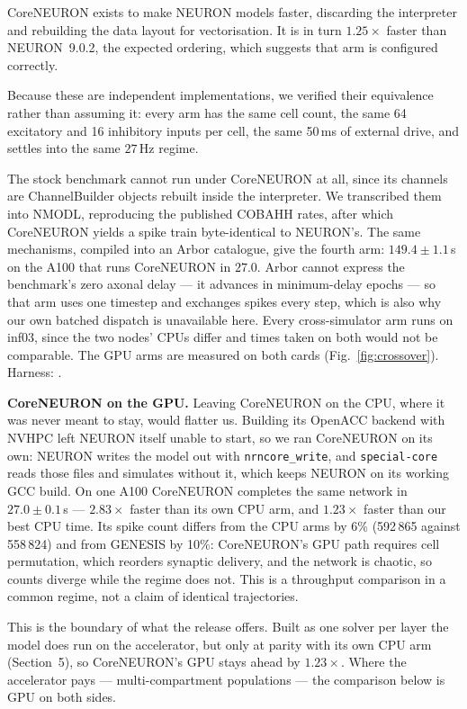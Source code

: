 \documentclass[preprint,12pt, a4paper]{elsarticle}
\begin{document}
\begin{enumerate}
CoreNEURON exists to make NEURON models faster, discarding the interpreter and rebuilding the data layout for vectorisation. It is in turn $1.25\times$ faster than NEURON~9.0.2, the expected ordering, which suggests that arm is configured correctly.

Because these are independent implementations, we verified their equivalence rather than assuming it: every arm has the same cell count, the same 64 excitatory and 16 inhibitory inputs per cell, the same 50\,ms of external drive, and settles into the same $27$\,Hz regime. 

The stock benchmark cannot run under CoreNEURON at all, since its channels are ChannelBuilder objects rebuilt inside the interpreter. We transcribed them into NMODL, reproducing the published COBAHH rates, after which CoreNEURON yields a spike train byte-identical to NEURON's. The same mechanisms, compiled into an Arbor catalogue, give the fourth arm: $149.4\pm1.1$\,s on the A100 that runs CoreNEURON in $27.0$. Arbor cannot express the benchmark's zero axonal delay --- it advances in minimum-delay epochs --- so that arm uses one timestep and exchanges spikes every step, which is also why our own batched dispatch is unavailable here. Every cross-simulator arm runs on inf03, since the two nodes' CPUs differ and times taken on both would not be comparable. The GPU arms are measured on both cards (Fig.~\ref{fig:crossover}). Harness: .

\textbf{CoreNEURON on the GPU.} Leaving CoreNEURON on the CPU, where it was never meant to stay, would flatter us. Building its OpenACC backend with NVHPC left NEURON itself unable to start, so we ran CoreNEURON on its own: NEURON writes the model out with \texttt{nrncore\_write}, and \texttt{special-core} reads those files and simulates without it, which keeps NEURON on its working GCC build. On one A100 CoreNEURON completes the same network in $27.0\pm0.1$\,s --- $2.83\times$ faster than its own CPU arm, and $1.23\times$ faster than our best CPU time. Its spike count differs from the CPU arms by 6\% (592\,865 against 558\,824) and from GENESIS by 10\%: CoreNEURON's GPU path requires cell permutation, which reorders synaptic delivery, and the network is chaotic, so counts diverge while the regime does not. This is a throughput comparison in a common regime, not a claim of identical trajectories.

This is the boundary of what the release offers. Built as one solver per layer the model does run on the accelerator, but only at parity with its own CPU arm (Section~5), so CoreNEURON's GPU stays ahead by $1.23\times$. Where the accelerator pays --- multi-compartment populations --- the comparison below is GPU on both sides.


\end{enumerate}
\end{document}

